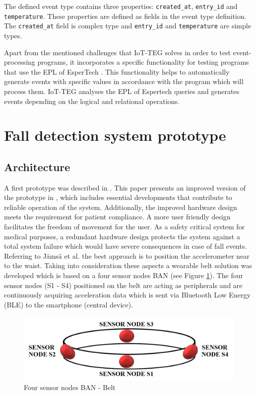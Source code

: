 \documentclass[10pt,journal,compsoc]{IEEEtran}
\begin{document}
The defined event type contains three properties: \texttt{created\_at},
\texttt{entry\_id} and \texttt{temperature}. These properties are defined as
fields in the event type definition. The \texttt{created\_at} field is complex
type and \texttt{entry\_id} and \texttt{temperature} are simple types. 

Apart from the mentioned challenges that IoT-TEG solves in order to test 
event-processing programs, it incorporates a specific functionality
for testing programs that use the EPL of EsperTech \cite{Esper:2016}. This functionality helps to 
automatically generate events with specific values in accordance with the 
program which will process them. IoT-TEG analyses the EPL of Espertech queries and 
generates events depending on the logical and relational operations. 


\section{Fall detection system prototype}
\label{sec:fall-detectionPrototype}	

\subsection{Architecture}
\label{subsec:Architecture}	
 A first prototype was described in \cite{LaBlunda.2016, LaBlunda.2016b}. This paper presents an improved version of the prototype in \cite{LaBlunda.2016, LaBlunda.2016b}, which includes essential developments that contribute to reliable operation of the system. Additionally, the improved hardware design meets the requirement for patient compliance. A more user friendly design facilitates the freedom of movement for the user. As a safety critical system for medical purposes, a redundant hardware design protects the system against a total system failure which would have severe consequences in case of fall events. Referring to J{\"a}ms{\"a} et al. \cite{jamsa2014fall} the best approach is to position the accelerometer near to the waist. Taking into consideration these aspects a wearable belt solution was developed which is based on a four sensor nodes BAN (see Figure \ref{fig:BanBelt}). The four sensor nodes (S1 - S4) positioned on the belt are acting as peripherals and are continuously acquiring acceleration data which is sent via Bluetooth Low Energy (BLE) to the smartphone (central device). 
\begin{figure}[!ht]
	\centering
	\includegraphics[scale=0.28]{Images/belt}
	\caption[Four sensor nodes BAN - Belt]{Four sensor nodes BAN - Belt \cite{LaBlunda.2016, LaBlunda.2016b}}
	\label{fig:BanBelt}
\end{figure}
\end{document}
